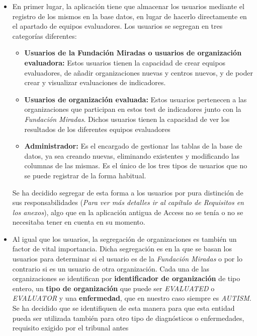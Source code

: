 \begin{itemize}
    \item En primer lugar, la aplicación tiene que almacenar los usuarios
    mediante el registro de los mismos en la base datos, en lugar de hacerlo
    directamente en el apartado de equipos evaluadores. Los usuarios se segregan
    en tres categorías diferentes:
    \begin{itemize}
        \item \textbf{Usuarios de la Fundación Miradas o usuarios de
        organización evaluadora: }Estos usuarios tienen la capacidad de crear
        equipos evaluadores, de añadir organizaciones nuevas y centros nuevos, y
        de poder crear y visualizar evaluaciones de indicadores. 
        \item \textbf{Usuarios de organización evaluada: }Estos usuarios
        pertenecen a las organizaciones que participan en estos test de
        indicadores junto con la \textit{Fundación Miradas}. Dichos usuarios
        tienen la capacidad de ver los resultados de los diferentes equipos
        evaluadores 
        \item \textbf{Administrador: }Es el encargado de gestionar las tablas de
        la base de datos, ya sea creando nuevas, eliminando existentes y
        modificando las columnas de las mismas. Es el único de los tres tipos de usuarios
        que no se puede registrar de la forma habitual.
    \end{itemize}
    Se ha decidido segregar de esta forma a los usuarios por pura distinción de
    sus responsabilidades (\textit{Para ver más detalles ir al capítulo de
    Requisitos en los anexos}), algo que en la aplicación antigua de Access no
    se tenía o no se necesitaba tener en cuenta en su momento.
    \item Al igual que los usuarios, la segregación de organizaciones es también
    un factor de vital importancia. Dicha segregación es en la que se basan los
    usuarios para determinar si el usuario es de la \textit{Fundación Miradas} o
    por lo contrario si es un usuario de otra organización. Cada una de las
    organizaciones se identifican por \textbf{identificador de organización} de
    tipo entero, un \textbf{tipo de organización} que puede ser
    \textit{EVALUATED} o \textit{EVALUATOR} y una \textbf{enfermedad}, que en
    nuestro caso siempre es \textit{AUTISM}. Se ha decidido que se identifiquen
    de esta manera para que esta entidad pueda ser utilizada también para otro
    tipo de diagnósticos o enfermedades, requisito exigido por el tribunal antes

\end{itemize}
